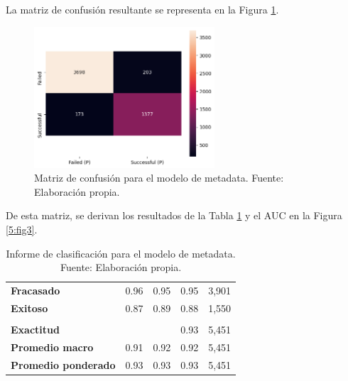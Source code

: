 La matriz de confusión resultante se representa en la Figura \ref{5:fig2}.

\begin{figure}[!ht]
	\begin{center}
		\includegraphics[width=0.60\textwidth]{5/figures/metadata_confusion_matrix.png}
		\caption{Matriz de confusión para el modelo de metadata. Fuente: Elaboración propia.}
		\label{5:fig2}
	\end{center}
\end{figure}

De esta matriz, se derivan los resultados de la Tabla \ref{5:table1} y el AUC en la Figura \ref{5:fig3}.

\begin{table}[h!]
	\centering
	\small
	\begin{tabular}{ |m{4.5cm}|m{2.5cm}|m{2.5cm}|m{2.5cm}|m{2.5cm}|  }
		\hline
		\rowcolor{bluejean}
		\Centering \color{white}{Valor}& \Centering \color{white}{Precisión}& \Centering \color{white}{Sensibilidad}& \Centering \color{white}{Puntaje F1}& \Centering \color{white}{Muestras}\\
		\hline
		\textbf{Fracasado} & 0.96 & 0.95 & 0.95 & 3,901 \\
		\hline
		\textbf{Exitoso} & 0.87 & 0.89 & 0.88 & 1,550 \\
		\hline
		\rowcolor{turq}
		\multicolumn{5}{c}{ } \\
		\hline
		\textbf{Exactitud} &  &	 & 0.93 & 5,451 \\
		\hline
		\textbf{Promedio macro} & 0.91 & 0.92 & 0.92 & 5,451 \\
		\hline
		\textbf{Promedio ponderado} & 0.93 & 0.93 & 0.93 & 5,451 \\
		\hline
	\end{tabular}
	\caption{Informe de clasificación para el modelo de metadata. Fuente: Elaboración propia.}
	\label{5:table1}
\end{table}


